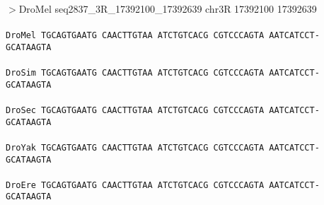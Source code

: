 \documentclass[11pt,twoside,reqno,a4paper]{article}
\begin{document}
\noindent
\newlength{\charwidth}$>$DroMel	seq2837\_3R\_17392100\_17392639	chr3R	17392100	17392639 \\
 \\
\texttt{DroMel	TGCAGTGAATG	CAACTTGTAA	ATCTGTCACG	CGTCCCAGTA	AATCATCCT-	GCATAAGTA\\
\hspace*{7\charwidth}\hspace*{1\charwidth}\hspace*{1\charwidth}\hspace*{1\charwidth}\hspace*{1\charwidth}\hspace*{1\charwidth}\\
DroSim	TGCAGTGAATG	CAACTTGTAA	ATCTGTCACG	CGTCCCAGTA	AATCATCCT-	GCATAAGTA\\
\hspace*{7\charwidth}\hspace*{1\charwidth}\hspace*{1\charwidth}\hspace*{1\charwidth}\hspace*{1\charwidth}\hspace*{1\charwidth}\\
DroSec	TGCAGTGAATG	CAACTTGTAA	ATCTGTCACG	CGTCCCAGTA	AATCATCCT-	GCATAAGTA\\
\hspace*{7\charwidth}\hspace*{1\charwidth}\hspace*{1\charwidth}\hspace*{1\charwidth}\hspace*{1\charwidth}\hspace*{1\charwidth}\\
DroYak	TGCAGTGAATG	CAACTTGTAA	ATCTGTCACG	CGTCCCAGTA	AATCATCCT-	GCATAAGTA\\
\hspace*{7\charwidth}\hspace*{1\charwidth}\hspace*{1\charwidth}\hspace*{1\charwidth}\hspace*{1\charwidth}\hspace*{1\charwidth}\\
DroEre	TGCAGTGAATG	CAACTTGTAA	ATCTGTCACG	CGTCCCAGTA	AATCATCCT-	GCATAAGTA\\
\hspace*{7\charwidth}\hspace*{1\charwidth}\hspace*{1\charwidth}\hspace*{1\charwidth}\hspace*{1\charwidth}\hspace*{1\charwidth}\\
}
\end{document}
